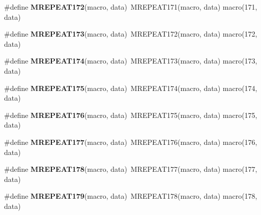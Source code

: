 \begin{DoxyCompactItemize}
\item 
\hypertarget{group__group__sam0__utils__mrepeat_ga6eb1cc1bab798bbc69ffcf54897bb268}{}\#define {\bfseries M\+R\+E\+P\+E\+A\+T172}(macro,  data)~M\+R\+E\+P\+E\+A\+T171(macro, data)   macro(171, data)\label{group__group__sam0__utils__mrepeat_ga6eb1cc1bab798bbc69ffcf54897bb268}

\item 
\hypertarget{group__group__sam0__utils__mrepeat_ga5882213b7cc6587681221c190929a058}{}\#define {\bfseries M\+R\+E\+P\+E\+A\+T173}(macro,  data)~M\+R\+E\+P\+E\+A\+T172(macro, data)   macro(172, data)\label{group__group__sam0__utils__mrepeat_ga5882213b7cc6587681221c190929a058}

\item 
\hypertarget{group__group__sam0__utils__mrepeat_ga2a61cb0b2664714f05b8b60b1430e182}{}\#define {\bfseries M\+R\+E\+P\+E\+A\+T174}(macro,  data)~M\+R\+E\+P\+E\+A\+T173(macro, data)   macro(173, data)\label{group__group__sam0__utils__mrepeat_ga2a61cb0b2664714f05b8b60b1430e182}

\item 
\hypertarget{group__group__sam0__utils__mrepeat_gaaad2bc103b928f34a3dc0a556f252b02}{}\#define {\bfseries M\+R\+E\+P\+E\+A\+T175}(macro,  data)~M\+R\+E\+P\+E\+A\+T174(macro, data)   macro(174, data)\label{group__group__sam0__utils__mrepeat_gaaad2bc103b928f34a3dc0a556f252b02}

\item 
\hypertarget{group__group__sam0__utils__mrepeat_gabc62b219e91e0d7826b32e29b7dd3834}{}\#define {\bfseries M\+R\+E\+P\+E\+A\+T176}(macro,  data)~M\+R\+E\+P\+E\+A\+T175(macro, data)   macro(175, data)\label{group__group__sam0__utils__mrepeat_gabc62b219e91e0d7826b32e29b7dd3834}

\item 
\hypertarget{group__group__sam0__utils__mrepeat_ga002048f3987041ffb748ab027b75d2cb}{}\#define {\bfseries M\+R\+E\+P\+E\+A\+T177}(macro,  data)~M\+R\+E\+P\+E\+A\+T176(macro, data)   macro(176, data)\label{group__group__sam0__utils__mrepeat_ga002048f3987041ffb748ab027b75d2cb}

\item 
\hypertarget{group__group__sam0__utils__mrepeat_gaba5fc88c5803e8272ce412fea9e908a3}{}\#define {\bfseries M\+R\+E\+P\+E\+A\+T178}(macro,  data)~M\+R\+E\+P\+E\+A\+T177(macro, data)   macro(177, data)\label{group__group__sam0__utils__mrepeat_gaba5fc88c5803e8272ce412fea9e908a3}

\item 
\hypertarget{group__group__sam0__utils__mrepeat_ga81eff2faaafc0dc30fa1c29f7c6e33f5}{}\#define {\bfseries M\+R\+E\+P\+E\+A\+T179}(macro,  data)~M\+R\+E\+P\+E\+A\+T178(macro, data)   macro(178, data)\label{group__group__sam0__utils__mrepeat_ga81eff2faaafc0dc30fa1c29f7c6e33f5}


\end{DoxyCompactItemize}
